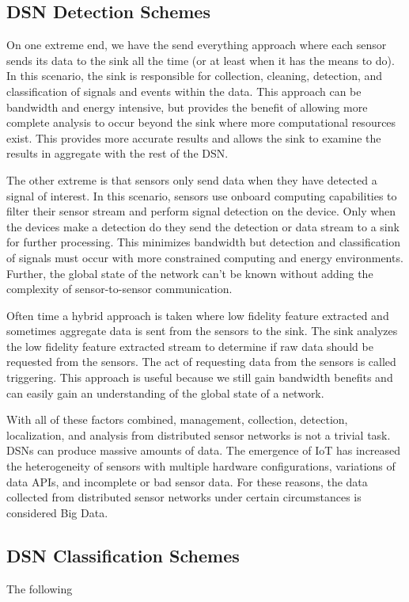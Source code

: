 \subsection{DSN Detection Schemes}
On one extreme end, we have the send everything approach where each sensor sends its data to the sink all the time (or at least when it has the means to do). In this scenario, the sink is responsible for collection, cleaning, detection, and classification of signals and events within the data. This approach can be bandwidth and energy intensive, but provides the benefit of allowing more complete analysis to occur beyond the sink where more computational resources exist. This provides more accurate results and allows the sink to examine the results in aggregate with the rest of the DSN.

The other extreme is that sensors only send data when they have detected a signal of interest. In this scenario, sensors use onboard computing capabilities to filter their sensor stream and perform signal detection on the device. Only when the devices make a detection do they send the detection or data stream to a sink for further processing. This minimizes bandwidth but detection and classification of signals must occur with more constrained computing and energy environments. Further, the global state of the network can't be known without adding the complexity of sensor-to-sensor communication.

Often time a hybrid approach is taken where low fidelity feature extracted and sometimes aggregate data is sent from the sensors to the sink. The sink analyzes the low fidelity feature extracted stream to determine if raw data should be requested from the sensors. The act of requesting data from the sensors is called triggering. This approach is useful because we still gain bandwidth benefits and can easily gain an understanding of the global state of a network.

With all of these factors combined, management, collection, detection, localization, and analysis from distributed sensor networks is not a trivial task. DSNs can produce massive amounts of data. The emergence of IoT has increased the heterogeneity of sensors with multiple hardware configurations, variations of data APIs, and incomplete or bad sensor data. For these reasons, the data collected from distributed sensor networks under certain circumstances is considered Big Data.

\subsection{DSN Classification Schemes}The following

